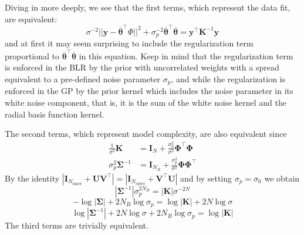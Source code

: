 \documentclass{article}
\begin{document}
Diving in more deeply, we see that the first terms, which represent the data fit, are equivalent:
\begin{equation}
    \sigma^{-2}||\mathbf{y}-\overline{\boldsymbol{\theta}} ^\top \Phi ||^2 +\sigma_p^{-2} \overline{\boldsymbol{\theta}}^\top\overline{\boldsymbol{\theta}} = \mathbf{y}^\top \mathbf{K}^{-1} \mathbf{y} 
\end{equation}and at first it may seem surprising to include the regularization term proportional to $\overline{\boldsymbol{\theta}}^\top\overline{\boldsymbol{\theta}}$ in this equation. Keep in mind that the regularization term is enforced in the BLR by the prior with uncorrelated weights with a spread equivalent to a pre-defined noise parameter $\sigma_p$, and while the regularization is enforced in the GP by the prior kernel which includes the noise parameter in its white noise component, that is, it is the sum of the white noise kernel and the radial basis function kernel. 

The second terms, which represent model complexity, are also equivalent since \begin{equation}
\begin{split}
\frac{1}{\sigma^2}\mathbf{K}&= \mathbf{I}_N+\frac{\sigma^2_0}{\sigma^2}\boldsymbol{\Phi}^\top\boldsymbol{\Phi} \\
\sigma_p^2\boldsymbol{\Sigma}^{-1} &=\mathbf{I}_{N_B}+ \frac{\sigma_p^2}{\sigma^2}\boldsymbol{\Phi}\boldsymbol{\Phi}^\top
\end{split}\end{equation}By the identity $|\mathbf{I}_{N_\text{inner}}+\mathbf{UV}^\top|=|\mathbf{I}_{N_\text{outer}}+\mathbf{V}^\top\mathbf{U}|$ and by setting $\sigma_p=\sigma_0$ we obtain
\begin{equation}
|\boldsymbol{\Sigma}^{-1}|\sigma_p^{2N_B}=|\mathbf{K}|\sigma^{-2N}\end{equation}\begin{equation}
-\log|\boldsymbol{\Sigma}|+2N_B\log\sigma_p=\log|\mathbf{K}|+ 2N\log\sigma\end{equation}\begin{equation}
\log|\boldsymbol{\Sigma}^{-1}|+2N\log\sigma+2N_B \log \sigma_p=\log|\mathbf{K}|\end{equation}The third terms are trivially equivalent.
\end{document}

